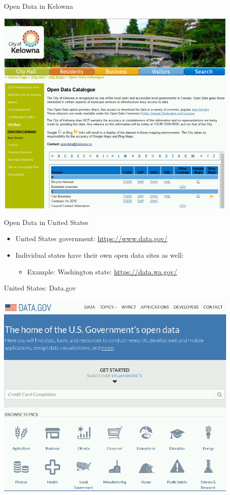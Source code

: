 \documentclass[xcolor=svgnames]{beamer}
\newcommand{\nl}{\\[1em]}
\begin{document}
\begin{frame}{Open Data in Kelowna}
\begin{center}
\includegraphics[width=0.9\textwidth]{img/kewl}
\end{center}
\end{frame}


\begin{frame}{Open Data in United States}
\begin{itemize}
\item United States government: \url{https://www.data.gov/}\nl

\item Individual states have their own open data sites as well:
\begin{itemize}
\item Example: Washington state: \url{https://data.wa.gov/}
\end{itemize}
\end{itemize}
\end{frame}


\begin{frame}{United States: Data.gov}
\begin{center}
\includegraphics[width=0.9\textwidth]{img/us}
\end{center}
\end{frame}
\end{document}
